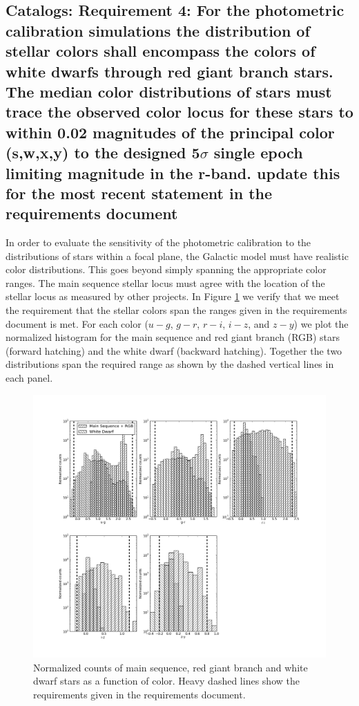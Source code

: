 \documentclass[]{article}
\begin{document}
{\subsection{Catalogs: Requirement 4: For the photometric calibration simulations
the distribution of stellar colors shall encompass the colors of white dwarfs through red giant branch stars.
The median color distributions of stars must trace the observed color locus for these stars to within 0.02 magnitudes
of the principal color (s,w,x,y) to the designed 5$\sigma$ single epoch limiting magnitude in the r-band.
{\bf update this for the most recent statement in the requirements document}}
In order to evaluate the sensitivity of the photometric calibration to the distributions of stars within a focal plane, the Galactic model
must have realistic color distributions.
This goes beyond simply spanning the appropriate color ranges.  The main sequence stellar locus must agree with the location of the
stellar locus as measured by other projects.  In Figure \ref{fig:starcolorspan} we verify that we meet the requirement that the stellar
colors span the ranges given in the requirements document is met.  For each color ($u-g$, $g-r$, $r-i$, $i-z$, and $z-y$) we plot the normalized histogram
for the main sequence and red giant branch (RGB) stars (forward hatching) and the white dwarf (backward hatching).  Together the two distributions span the required
range as shown by the dashed vertical lines in each panel.  
\begin{figure}[H]
\centering
\includegraphics[width=5in]{validation_figures/star_lsst_color_hist.png}
\caption{Normalized counts of main sequence, red giant branch and white dwarf stars as a function of color.  Heavy dashed lines show the requirements given in the requirements document.\label{fig:starcolorspan}}
\end{figure}

}
\end{document}
